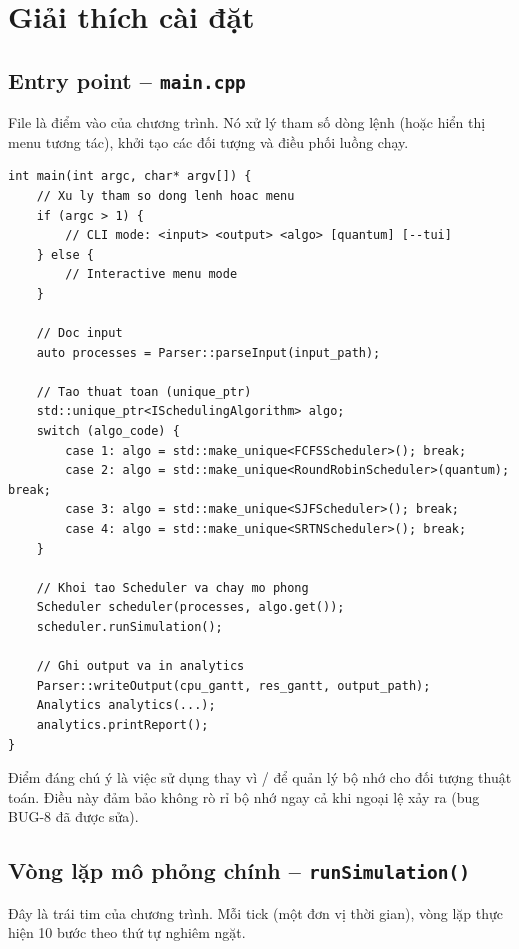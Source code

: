 \chapter{Giải thích cài đặt}

\section{Entry point -- \texttt{main.cpp}}

File  là điểm vào của chương trình. Nó xử lý tham số dòng lệnh (hoặc hiển thị menu tương tác), khởi tạo các đối tượng và điều phối luồng chạy.

\begin{lstlisting}
int main(int argc, char* argv[]) {
    // Xu ly tham so dong lenh hoac menu
    if (argc > 1) {
        // CLI mode: <input> <output> <algo> [quantum] [--tui]
    } else {
        // Interactive menu mode
    }
    
    // Doc input
    auto processes = Parser::parseInput(input_path);
    
    // Tao thuat toan (unique_ptr)
    std::unique_ptr<ISchedulingAlgorithm> algo;
    switch (algo_code) {
        case 1: algo = std::make_unique<FCFSScheduler>(); break;
        case 2: algo = std::make_unique<RoundRobinScheduler>(quantum); break;
        case 3: algo = std::make_unique<SJFScheduler>(); break;
        case 4: algo = std::make_unique<SRTNScheduler>(); break;
    }
    
    // Khoi tao Scheduler va chay mo phong
    Scheduler scheduler(processes, algo.get());
    scheduler.runSimulation();
    
    // Ghi output va in analytics
    Parser::writeOutput(cpu_gantt, res_gantt, output_path);
    Analytics analytics(...);
    analytics.printReport();
}
\end{lstlisting}

Điểm đáng chú ý là việc sử dụng  thay vì / để quản lý bộ nhớ cho đối tượng thuật toán. Điều này đảm bảo không rò rỉ bộ nhớ ngay cả khi ngoại lệ xảy ra (bug BUG-8 đã được sửa).

\section{Vòng lặp mô phỏng chính -- \texttt{runSimulation()}}

Đây là trái tim của chương trình. Mỗi tick (một đơn vị thời gian), vòng lặp thực hiện 10 bước theo thứ tự nghiêm ngặt.

